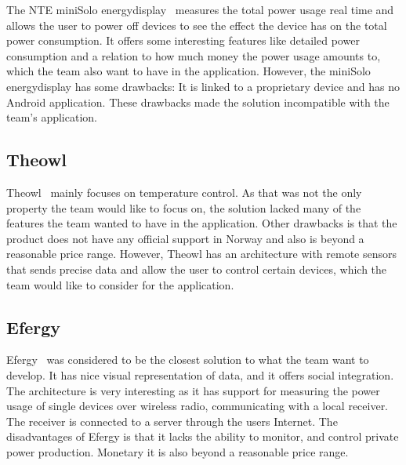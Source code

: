 The NTE miniSolo energydisplay~\cite{nte} measures the total power usage real time and allows the user to power off devices to see the effect the device has on the total power consumption. It offers some interesting features like detailed power consumption and a relation to how much money the power usage amounts to, which the team also want to have in the application. However, the miniSolo energydisplay has some drawbacks: It is linked to a proprietary device and has no Android application. These drawbacks made the solution incompatible with the team's application.



\subsection{Theowl}

Theowl~\cite{theowl} mainly focuses on temperature control. 
As that was not the only property the team would like to focus on, the solution lacked many of the features the team wanted to have in the application. Other drawbacks is that the product does not have any official support in Norway and also is beyond a reasonable price range. However, Theowl has an architecture with remote sensors that sends precise data and allow the user to control certain devices, which the team would like to consider for the application.


\subsection{Efergy}

Efergy~\cite{efergy} was considered to be the closest solution to what the team want to develop. It has nice visual representation of data, and it offers social integration. The architecture is very interesting as it has support for measuring the power usage of single devices over wireless radio, communicating with a local receiver. The receiver is connected to a server through the users Internet. The disadvantages of Efergy is that it lacks the ability to monitor, and control private power production. Monetary it is also beyond a reasonable price range.



